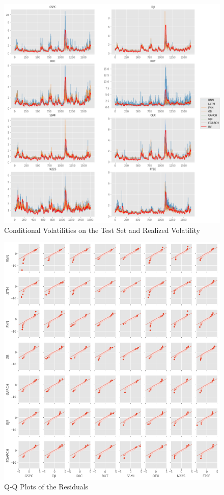 \documentclass[a4paper, oneside]{discothesis}
\begin{document}
\begin{figure}
    \centering
    \includegraphics[width = 12.4cm]{figures/VOLA_FIGURS.png}
    \caption{Conditional Volatilities on the Test Set and Realized Volatility}
    \label{fig:my_label}
\end{figure}

\begin{figure}
    \centering
    \includegraphics[width = 13.4cm]{figures/QQ_plot.png}
    \caption{ Q-Q Plots of the Residuals}
    \label{fig:my_label}
\end{figure}


\printbibliography
\end{document}
